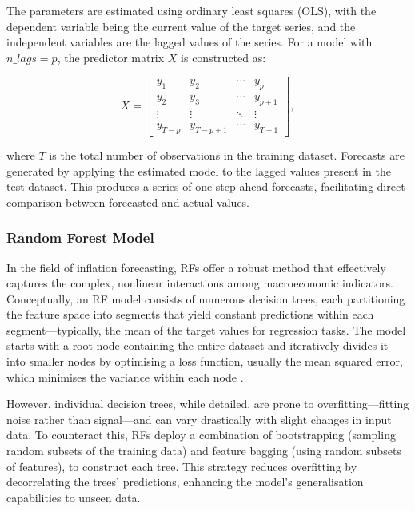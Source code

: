 The parameters are estimated using ordinary least squares (OLS), with the dependent variable being the current value of the target series, and the independent variables are the lagged values of the series. For a model with $n\_lags = p$, the predictor matrix $X$ is constructed as:

\begin{equation}
    X = \begin{bmatrix}
    y_{1} & y_{2} & \cdots & y_{p} \\
    y_{2} & y_{3} & \cdots & y_{p+1} \\
    \vdots & \vdots & \ddots & \vdots \\
    y_{T-p} & y_{T-p+1} & \cdots & y_{T-1}
    \end{bmatrix},
\end{equation}

where $T$ is the total number of observations in the training dataset. Forecasts are generated by applying the estimated model to the lagged values present in the test dataset. This produces a series of one-step-ahead forecasts, facilitating direct comparison between forecasted and actual values.


\subsubsection{Random Forest Model}

In the field of inflation forecasting, RFs offer a robust method that effectively captures the complex, nonlinear interactions among macroeconomic indicators. Conceptually, an RF model consists of numerous decision trees, each partitioning the feature space into segments that yield constant predictions within each segment—typically, the mean of the target values for regression tasks. The model starts with a root node containing the entire dataset and iteratively divides it into smaller nodes by optimising a loss function, usually the mean squared error, which minimises the variance within each node \autocite{Breiman2001RandomForests}.

However, individual decision trees, while detailed, are prone to overfitting—fitting noise rather than signal—and can vary drastically with slight changes in input data. To counteract this, RFs deploy a combination of bootstrapping (sampling random subsets of the training data) and feature bagging (using random subsets of features), to construct each tree. This strategy reduces overfitting by decorrelating the trees’ predictions, enhancing the model's generalisation capabilities to unseen data.

